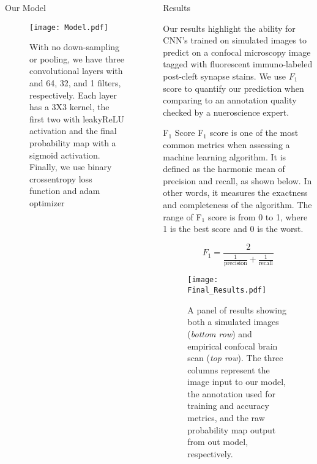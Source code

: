 \documentclass[final]{beamer}
\newlength{\onecolwid}
\begin{document}
\begin{frame}[t]
\begin{columns}[t]
\begin{column}{\onecolwid}
\begin{block}{Our Model}
    \begin{figure}
        \texttt{[image: Model.pdf]}
        \setlength{\belowcaptionskip}{-20pt}
        \caption{
        With no down-sampling or pooling, we have three convolutional layers with and 64, 32, and 1 filters, respectively. Each layer has a 3X3 kernel, the first two with leakyReLU activation and the final probability map with a sigmoid activation. Finally, we use binary crossentropy loss function and adam optimizer}
    \end{figure}


\end{block}

\end{column}

\begin{column}{\onecolwid}
\begin{block}{Results}

Our results highlight the ability for CNN's trained on simulated images to predict on a confocal microscopy image tagged with fluorescent immuno-labeled post-cleft synapse stains. We use $F_{1}$ score to quantify our prediction when comparing to an annotation quality checked by a nueroscience expert.
\vspace{.5in}
    \begin{alertblock}{F$_1$ Score}
    F$_1$ score is one of the most common metrics when assessing a machine learning algorithm. It is defined as the harmonic mean of precision and recall, as shown below. In other words, it measures the exactness and completeness of the algorithm. The range of F$_1$ score is from 0 to 1, where 1 is the best score and 0 is the worst.
  
      \begin{equation}
            F_1 =\frac{2}{\frac{1}{\text{precision}}+\frac{1}{\text{recall}}}
        \end{equation}
    \end{alertblock}
    
    \begin{figure}
        \texttt{[image: Final\_Results.pdf]}
         \setlength{\belowcaptionskip}{-30pt}
        \caption{ A panel of results showing both a simulated images (\textit{bottom row}) and empirical confocal brain scan (\textit{top row}). The three columns represent the image input to our model, the annotation used for training and accuracy metrics, and the raw probability map output from out model, respectively.} 
    \end{figure}
    \vspace{.5in}


\end{block}
\end{column}
\end{columns}
\end{frame}
\end{document}
